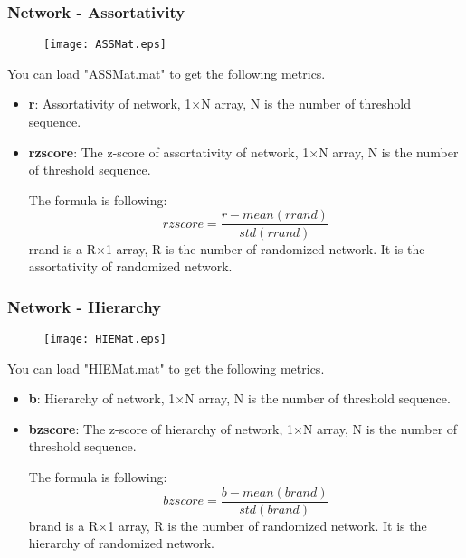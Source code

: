 \documentclass[11pt]{article}
\begin{document}
			\subsubsection{Network - Assortativity}
				\begin{figure}
					\begin{center}
						\texttt{[image: ASSMat.eps]}
					\end{center}
				\end{figure}
				You can load "ASSMat.mat" to get the following metrics.
				\begin{itemize}
					\item \textbf{r}: Assortativity of network,
						1$\times$N array, N is the number of threshold sequence.
					\item \textbf{rzscore}: The z-score of assortativity of network,
						1$\times$N array, N is the number of threshold sequence.

						The formula is following:
						$$rzscore=\frac{r-mean(rrand)}{std(rrand)}$$
						rrand is a R$\times$1 array, R is the number of randomized network. 
						It is the assortativity of randomized network.
				\end{itemize}
			\subsubsection{Network - Hierarchy}
				\begin{figure}
					\begin{center}
						\texttt{[image: HIEMat.eps]}
					\end{center}
				\end{figure}
				You can load "HIEMat.mat" to get the following metrics.
				\begin{itemize}
					\item \textbf{b}: Hierarchy of network,
						1$\times$N array, N is the number of threshold sequence.
					\item \textbf{bzscore}: The z-score of hierarchy of network,
						1$\times$N array, N is the number of threshold sequence.

						The formula is following:
						$$bzscore=\frac{b-mean(brand)}{std(brand)}$$
						brand is a R$\times$1 array, R is the number of randomized network. 
						It is the hierarchy of randomized network.
				\end{itemize}
\end{document}
